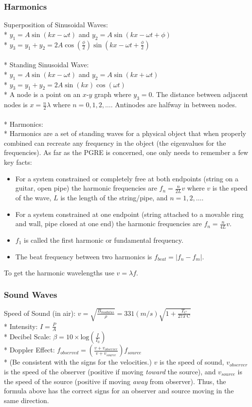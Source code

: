 \subsubsection{Harmonics}
Superposition of Sinusoidal Waves:\\*
\( y_1=A\sin(kx-\omega t)\) and \( y_2=A\sin(kx-\omega t+\phi)\)\\*
\(y_3=y_1+y_2=2A\cos\left(\frac{\phi}{2}\right)\sin\left(kx-\omega t+\frac{\phi}{2}\right)\)\\\\*
Standing Sinusoidal Wave:\\*
\( y_1=A\sin(kx-\omega t)\) and \( y_2=A\sin(kx+\omega t)\)\\*
\(y_3=y_1+y_2=2A\sin(kx)\cos(\omega t)\)\\*
A node is a point on an \(x\)-\(y\) graph where \(y_3=0\).
The distance between adjacent nodes is \(x=\frac{n}{2}\lambda\) where \(n=0,1,2,\ldots\).
Antinodes are halfway in between nodes.\\\\*
Harmonics:\\*
Harmonics are a set of standing waves for a physical object that when properly combined can recreate any frequency in the object (the eigenvalues for the frequencies).
As far as the PGRE is concerned, one only needs to remember a few key facts:
\begin{itemize}
\item For a system constrained or completely free at both endpoints (string on a guitar, open pipe) the harmonic frequencies are \(f_n=\frac{n}{2L}v\) where \(v\) is the speed of the wave, \(L\) is the length of the string/pipe, and \(n=1,2,\ldots\).
\item For a system constrained at one endpoint (string attached to a movable ring and wall, pipe closed at one end) the harmonic frequencies are \(f_n=\frac{n}{4L}v\).
\item \(f_1\) is called the first harmonic or fundamental frequency.
\item The beat frequency between two harmonics is \(f_{beat}=|f_n-f_m|\).
\end{itemize}
To get the harmonic wavelengths use \(v=\lambda f\).

\subsubsection{Sound Waves}
Speed of Sound (in air): \(v=\sqrt{\frac{B_{modulus}}{\rho}}=331(m/s)\sqrt{1+\frac{T_C}{273^{\circ}\mathrm{C}}}\)\\*
Intensity: \(I=\frac{P}{A}\)\\*
Decibel Scale: \(\beta=10\times\mathrm{log}\left(\frac{I}{I_0}\right)\)\\*
Doppler Effect: \(\displaystyle f_{observed}=\left(\frac{v+v_{observer}}{v+v_{source}}\right)f_{source}\)\\*
(Be consistent with the signs for the velocities.)
\(v\) is the speed of sound, \(v_{observer}\) is the speed of the observer (positive if moving \emph{toward} the source), and \(v_{source}\) is the speed of the source (positive if moving \emph{away} from observer).
Thus, the formula above has the correct signs for an observer and source moving in the same direction.
